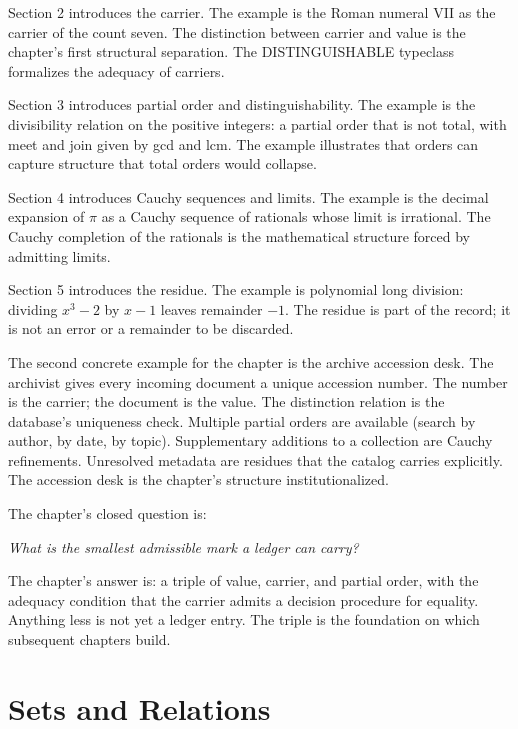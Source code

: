 \begin{chapteressay}
Section 2 introduces the carrier. The example is the Roman numeral
VII as the carrier of the count seven. The distinction between
carrier and value is the chapter's first structural separation. The
DISTINGUISHABLE typeclass formalizes the adequacy of carriers.

Section 3 introduces partial order and distinguishability. The
example is the divisibility relation on the positive integers: a
partial order that is not total, with meet and join given by gcd and
lcm. The example illustrates that orders can capture structure that
total orders would collapse.

Section 4 introduces Cauchy sequences and limits. The example is the
decimal expansion of $\pi$ as a Cauchy sequence of rationals whose
limit is irrational. The Cauchy completion of the rationals is the
mathematical structure forced by admitting limits.

Section 5 introduces the residue. The example is polynomial long
division: dividing $x^3 - 2$ by $x - 1$ leaves remainder $-1$. The
residue is part of the record; it is not an error or a remainder to
be discarded.

The second concrete example for the chapter is the archive accession
desk. The archivist gives every incoming document a unique accession
number. The number is the carrier; the document is the value. The
distinction relation is the database's uniqueness check. Multiple
partial orders are available (search by author, by date, by topic).
Supplementary additions to a collection are Cauchy refinements.
Unresolved metadata are residues that the catalog carries
explicitly. The accession desk is the chapter's structure
institutionalized.

The chapter's closed question is:

\begin{center}
\emph{What is the smallest admissible mark a ledger can carry?}
\end{center}

The chapter's answer is: a triple of value, carrier, and partial
order, with the adequacy condition that the carrier admits a
decision procedure for equality. Anything less is not yet a
ledger entry. The triple is the foundation on which subsequent
chapters build.

\end{chapteressay}

\section{Sets and Relations}
\label{se:sets-and-relations}

